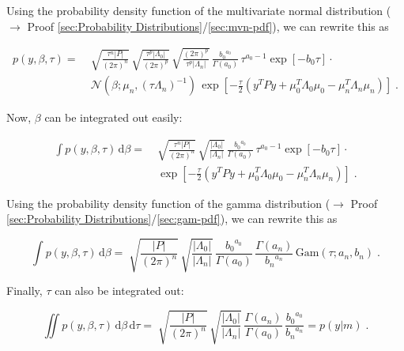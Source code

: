 \documentclass[a4paper,12pt]{book}
\begin{document}
Using the probability density function of the multivariate normal distribution ($\rightarrow$ Proof \ref{sec:Probability Distributions}/\ref{sec:mvn-pdf}), we can rewrite this as

\begin{equation} \label{eq:blr-lme-GLM-NG-LME-s2}
\begin{split}
p(y,\beta,\tau) = \; & \sqrt{\frac{\tau^n |P|}{(2 \pi)^n}} \, \sqrt{\frac{\tau^p |\Lambda_0|}{(2 \pi)^p}} \, \sqrt{\frac{(2 \pi)^p}{\tau^p |\Lambda_n|}} \, \frac{ {b_0}^{a_0}}{\Gamma(a_0)} \, \tau^{a_0-1} \exp[-b_0 \tau] \cdot \\
& \mathcal{N}(\beta; \mu_n, (\tau \Lambda_n)^{-1}) \, \exp\left[ -\frac{\tau}{2} (y^T P y + \mu_0^T \Lambda_0 \mu_0 - \mu_n^T \Lambda_n \mu_n) \right] \; .
\end{split}
\end{equation}

Now, $\beta$ can be integrated out easily:

\begin{equation} \label{eq:blr-lme-GLM-NG-LME-s3}
\begin{split}
\int p(y,\beta,\tau) \, \mathrm{d}\beta = \; & \sqrt{\frac{\tau^n |P|}{(2 \pi)^n}} \, \sqrt{\frac{|\Lambda_0|}{|\Lambda_n|}} \, \frac{ {b_0}^{a_0}}{\Gamma(a_0)} \, \tau^{a_0-1} \exp[-b_0 \tau] \cdot \\
& \exp\left[ -\frac{\tau}{2} (y^T P y + \mu_0^T \Lambda_0 \mu_0 - \mu_n^T \Lambda_n \mu_n) \right] \; .
\end{split}
\end{equation}

Using the probability density function of the gamma distribution ($\rightarrow$ Proof \ref{sec:Probability Distributions}/\ref{sec:gam-pdf}), we can rewrite this as

\begin{equation}\label{eq:blr-lme-GLM-NG-LME-s4}
\int p(y,\beta,\tau) \, \mathrm{d}\beta = \; \sqrt{\frac{|P|}{(2 \pi)^n}} \, \sqrt{\frac{|\Lambda_0|}{|\Lambda_n|}} \, \frac{ {b_0}^{a_0}}{\Gamma(a_0)} \, \frac{\Gamma(a_n)}{ {b_n}^{a_n}} \, \mathrm{Gam}(\tau; a_n, b_n) \; .
\end{equation}

Finally, $\tau$ can also be integrated out:

\begin{equation} \label{eq:blr-lme-GLM-NG-LME-s5}
\iint p(y,\beta,\tau) \, \mathrm{d}\beta \, \mathrm{d}\tau = \; \sqrt{\frac{|P|}{(2 \pi)^n}} \, \sqrt{\frac{|\Lambda_0|}{|\Lambda_n|}} \, \frac{\Gamma(a_n)}{\Gamma(a_0)} \, \frac{ {b_0}^{a_0}}{ {b_n}^{a_n}} = p(y|m) \; .
\end{equation}
\end{document}
